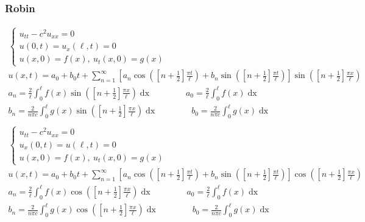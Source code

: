 \subsubsection*{Robin}
\begin{gather*}
\begin{cases}
u_{tt} - c^{2}u_{xx} = 0\\
u(0,t) = u_{x}(\ell,t) = 0\\
u(x,0) = f(x),\ u_{t}(x,0) = g(x)
\end{cases}\\
u(x,t) = a_{0} + b_{0}t +\sum_{n=1}^{\infty}\left[a_{n}\cos{\left(\left[n + \frac{1}{2}\right]\frac{\pi
t}{\ell}\right)} + b_{n}\sin{\left(\left[n + \frac{1}{2}\right]\frac{\pi
t}{\ell}\right)}\right]\sin{\left(\left[n + \frac{1}{2}\right]\frac{\pi x}{\ell}\right)}\\
a_{n} = \frac{2}{\ell}\int_{0}^{\ell}f(x)\sin{\left(\left[n + \frac{1}{2}\right]\frac{\pi
x}{\ell}\right)}\mathop{dx}\qquad\qquad
a_{0} = \frac{2}{\ell}\int_{0}^{\ell}f(x)\mathop{dx}\\
b_{n} = \frac{2}{n\pi c}\int_{0}^{\ell}g(x)\sin{\left(\left[n + \frac{1}{2}\right]\frac{\pi
x}{\ell}\right)}\mathop{dx}\qquad\qquad
b_{0} = \frac{2}{n\pi c}\int_{0}^{\ell}g(x)\mathop{dx}\\
\end{gather*}
\begin{gather*}
\begin{cases}
u_{tt} - c^{2}u_{xx} = 0\\
u_{x}(0,t) = u(\ell,t) = 0\\
u(x,0) = f(x),\ u_{t}(x,0) = g(x)
\end{cases}\\
u(x,t) = a_{0} + b_{0}t +\sum_{n=1}^{\infty}\left[a_{n}\cos{\left(\left[n + \frac{1}{2}\right]\frac{\pi
t}{\ell}\right)} + b_{n}\sin{\left(\left[n + \frac{1}{2}\right]\frac{\pi
t}{\ell}\right)}\right]\cos{\left(\left[n + \frac{1}{2}\right]\frac{\pi x}{\ell}\right)}\\
a_{n} = \frac{2}{\ell}\int_{0}^{\ell}f(x)\cos{\left(\left[n + \frac{1}{2}\right]\frac{\pi
x}{\ell}\right)}\mathop{dx}\qquad\qquad
a_{0} = \frac{2}{\ell}\int_{0}^{\ell}f(x)\mathop{dx}\\
b_{n} = \frac{2}{n\pi c}\int_{0}^{\ell}g(x)\cos{\left(\left[n + \frac{1}{2}\right]\frac{\pi
x}{\ell}\right)}\mathop{dx}\qquad\qquad
b_{0} = \frac{2}{n\pi c}\int_{0}^{\ell}g(x)\mathop{dx}\\
\end{gather*}

